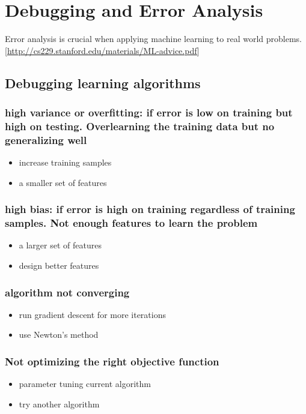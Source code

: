 \documentclass[11pt]{article}
\begin{document}
\section{Debugging and Error Analysis}
\label{sec:orgf0656b9}
Error analysis is crucial when applying machine learning to real world problems.
[\url{http://cs229.stanford.edu/materials/ML-advice.pdf}]
\subsection{Debugging learning algorithms}
\label{sec:org19ee562}
\subsubsection{high variance or overfitting: if error is low on training but high on testing. Overlearning the training data but no generalizing well}
\label{sec:orgc9fee86}
\begin{itemize}
\item increase training samples
\item a smaller set of features
\end{itemize}
\subsubsection{high bias: if error is high on training regardless of training samples. Not enough features to learn the problem}
\label{sec:orgcc4ecd3}
\begin{itemize}
\item a larger set of features
\item design better features
\end{itemize}
\subsubsection{algorithm not converging}
\label{sec:org26b4ea5}
\begin{itemize}
\item run gradient descent for more iterations
\item use Newton's method
\end{itemize}
\subsubsection{Not optimizing the right objective function}
\label{sec:orgd904dfc}
\begin{itemize}
\item parameter tuning current algorithm
\item try another algorithm
\end{itemize}
\end{document}
